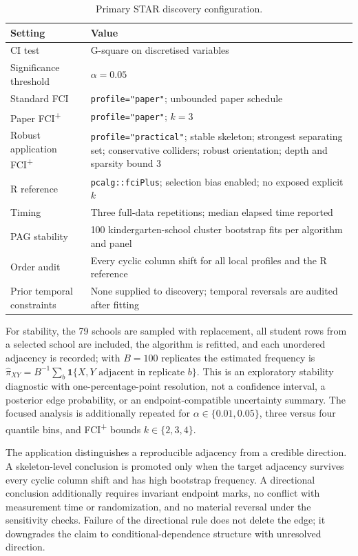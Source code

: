 \documentclass[11pt,a4paper]{article}
\newcommand{\FCIplus}{FCI\textsuperscript{+}}
\newcommand{\code}[1]{\texttt{#1}}
\begin{document}
\begin{table}[H]
\caption{Primary STAR discovery configuration.}
\label{tab:star-config}
\begin{tabularx}{\textwidth}{lY}
\toprule
Setting & Value \\
\midrule
CI test & G-square on discretised variables \\
Significance threshold & \(\alpha = 0.05\) \\
Standard FCI & \code{profile="paper"}; unbounded paper schedule \\
Paper \FCIplus{} & \code{profile="paper"}; \(k = 3\) \\
Robust application \FCIplus{} & \code{profile="practical"}; stable skeleton;
strongest separating set; conservative colliders; robust orientation; depth and
sparsity bound 3 \\
R reference & \code{pcalg::fciPlus}; selection bias enabled; no exposed
explicit \(k\) \\
Timing & Three full-data repetitions; median elapsed time reported \\
PAG stability & 100 kindergarten-school cluster bootstrap fits per algorithm
and panel \\
Order audit & Every cyclic column shift for all local profiles and the R
reference \\
Prior temporal constraints & None supplied to discovery; temporal reversals are
audited after fitting \\
\bottomrule
\end{tabularx}
\end{table}

For stability, the 79 schools are sampled with replacement, all student rows
from a selected school are included, the algorithm is refitted, and each
unordered adjacency is recorded; with \(B = 100\) replicates the estimated
frequency is \(\hat{\pi}_{XY} = B^{-1}\sum_b \mathbf{1}\{X, Y \text{ adjacent in
replicate } b\}\). This is an exploratory stability diagnostic with
one-percentage-point resolution, not a confidence interval, a posterior edge
probability, or an endpoint-compatible uncertainty summary. The focused analysis
is additionally repeated for \(\alpha \in \{0.01, 0.05\}\), three versus four
quantile bins, and \FCIplus{} bounds \(k \in \{2,3,4\}\).

The application distinguishes a reproducible adjacency from a credible
direction. A skeleton-level conclusion is promoted only when the target
adjacency survives every cyclic column shift and has high bootstrap frequency. A
directional conclusion additionally requires invariant endpoint marks, no
conflict with measurement time or randomization, and no material reversal under
the sensitivity checks. Failure of the directional rule does not delete the
edge; it downgrades the claim to conditional-dependence structure with
unresolved direction.
\end{document}
